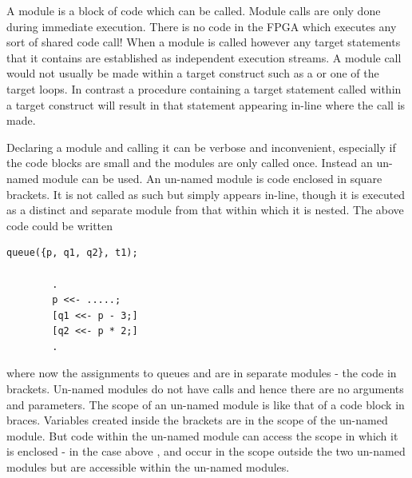         A module is a block of code which can be called. Module calls are
        only done during immediate execution. There is no code in the FPGA which
        executes any sort of shared code call! When a module is called however
        any target statements that it contains are established as independent
        execution streams. A module call would not usually be made within a target
        construct such as a  or one of the target loops. In contrast
        a procedure containing a target statement called within a target construct
        will result in that statement appearing in-line where the call is made.

        Declaring a module and calling it can be verbose and inconvenient, especially if
        the code blocks are small and the modules are only called once. Instead an un-named
        module can be used. An un-named module is code enclosed in square brackets. It is
        not called as such but simply appears in-line, though it is executed as a distinct
        and separate module from that within which it is nested. The above code could be
        written
        \begin{lstlisting}[language=threepl]
        queue({p, q1, q2}, t1);

        .
        p <<- .....;
        [q1 <<- p - 3;]
        [q2 <<- p * 2;]
        .
        \end{lstlisting}
        where now the assignments to queues  and  are in separate
        modules - the code in brackets. Un-named modules do not have calls and hence
        there are no arguments and parameters. The scope of an un-named module is like
        that of a code block in braces. Variables created inside the brackets are in
        the scope of the un-named module. But code within the un-named module can
        access the scope in which it is enclosed - in the case above , 
        and  occur in the scope outside the two un-named modules but are
        accessible within the un-named modules.

